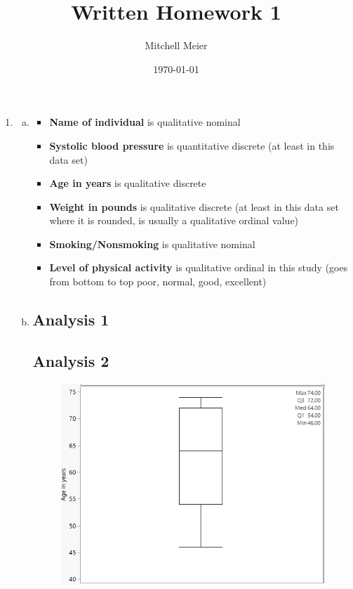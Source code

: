 \documentclass[14pt]{article}
\title{Written Homework 1}
\author{Mitchell Meier}
\date{\today}
\newcommand{\bd}{\textbf}
\begin{document}
\maketitle

\begin{enumerate}

\item

\begin{enumerate}[(a)]

\item
\begin{itemize}
\item \bd{Name of individual} is qualitative nominal 
\item \bd{Systolic blood pressure} is quantitative discrete (at least in this data set) 
\item \bd{Age in years} is qualitative discrete 
\item \bd{Weight in pounds} is qualitative discrete (at least in this data set where it is rounded, is usually a qualitative ordinal value) 
\item \bd{Smoking/Nonsmoking} is qualitative nominal 
\item \bd{Level of physical activity} is qualitative ordinal in this study (goes from bottom to top poor, normal, good, excellent) 
\end{itemize}

\item

\subsection*{Analysis 1}

\subsection*{Analysis 2}


\begin{figure}[h]
\includegraphics[scale=0.75]{hw1Pics/ageboxplot.PNG}
\centering
\end{figure}


\end{enumerate}
\end{enumerate}
\end{document}
